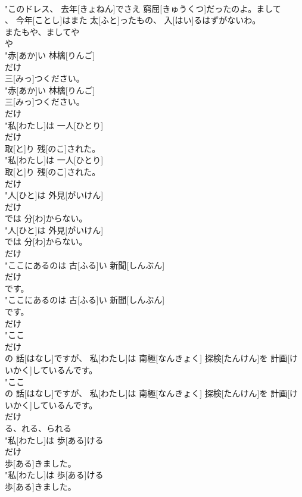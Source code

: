 \documentclass[8pt]{extreport}
\begin{document}
\begin{CJK}{UTF8}{min}
\\	"このドレス、 去年[きょねん]でさえ 窮屈[きゅうくつ]だったのよ。まして
\\	、 今年[ことし]はまた 太[ふと]ったもの、 入[はい]るはずがないわ。
\\	またもや、ましてや	
\\	や
\\	"赤[あか]い 林檎[りんご]
\\	だけ
\\	三[みっ]つください。
\\	"赤[あか]い 林檎[りんご]
\\	三[みっ]つください。
\\	だけ
\\	"私[わたし]は 一人[ひとり]
\\	だけ
\\	取[と]り 残[のこ]された。
\\	"私[わたし]は 一人[ひとり]
\\	取[と]り 残[のこ]された。
\\	だけ
\\	"人[ひと]は 外見[がいけん]
\\	だけ
\\	では 分[わ]からない。
\\	"人[ひと]は 外見[がいけん]
\\	では 分[わ]からない。
\\	だけ
\\	"ここにあるのは 古[ふる]い 新聞[しんぶん]
\\	だけ
\\	です。
\\	"ここにあるのは 古[ふる]い 新聞[しんぶん]
\\	です。
\\	だけ
\\	"ここ
\\	だけ
\\	の 話[はなし]ですが、 私[わたし]は 南極[なんきょく] 探検[たんけん]を 計画[けいかく]しているんです。
\\	"ここ
\\	の 話[はなし]ですが、 私[わたし]は 南極[なんきょく] 探検[たんけん]を 計画[けいかく]しているんです。
\\	だけ
\\	る、れる、られる 
\\	"私[わたし]は 歩[ある]ける
\\	だけ
\\	歩[ある]きました。
\\	"私[わたし]は 歩[ある]ける
\\	歩[ある]きました。

\end{CJK}
\end{document}
